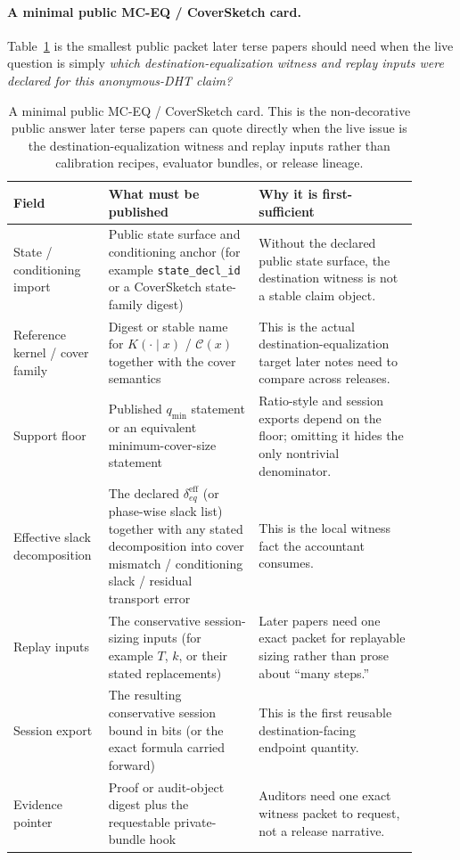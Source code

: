 \documentclass[11pt]{article}
\begin{document}
\paragraph{A minimal public MC-EQ / CoverSketch card.}
Table~\ref{tab:minimal-mceq-card} is the smallest public packet later terse papers should need when the live question is simply \emph{which destination-equalization witness and replay inputs were declared for this anonymous-DHT claim?}

\begin{table}[t]
\centering
\small
\begin{tabular}{@{}p{0.18\linewidth}p{0.35\linewidth}p{0.37\linewidth}@{}}
\toprule
Field & What must be published & Why it is first-sufficient \\
\midrule
State / conditioning import & Public state surface and conditioning anchor (for example \texttt{state\_decl\_id} or a CoverSketch state-family digest) & Without the declared public state surface, the destination witness is not a stable claim object. \\
Reference kernel / cover family & Digest or stable name for $K(\cdot\mid x)$ / $\mathcal{C}(x)$ together with the cover semantics & This is the actual destination-equalization target later notes need to compare across releases. \\
Support floor & Published $q_{\min}$ statement or an equivalent minimum-cover-size statement & Ratio-style and session exports depend on the floor; omitting it hides the only nontrivial denominator. \\
Effective slack decomposition & The declared $\delta_{eq}^{\mathrm{eff}}$ (or phase-wise slack list) together with any stated decomposition into cover mismatch / conditioning slack / residual transport error & This is the local witness fact the accountant consumes. \\
Replay inputs & The conservative session-sizing inputs (for example $T$, $k$, or their stated replacements) & Later papers need one exact packet for replayable sizing rather than prose about ``many steps.'' \\
Session export & The resulting conservative session bound in bits (or the exact formula carried forward) & This is the first reusable destination-facing endpoint quantity. \\
Evidence pointer & Proof or audit-object digest plus the requestable private-bundle hook & Auditors need one exact witness packet to request, not a release narrative. \\
\bottomrule
\end{tabular}
\caption{A minimal public MC-EQ / CoverSketch card. This is the non-decorative public answer later terse papers can quote directly when the live issue is the destination-equalization witness and replay inputs rather than calibration recipes, evaluator bundles, or release lineage.}
\label{tab:minimal-mceq-card}
\end{table}
\end{document}
